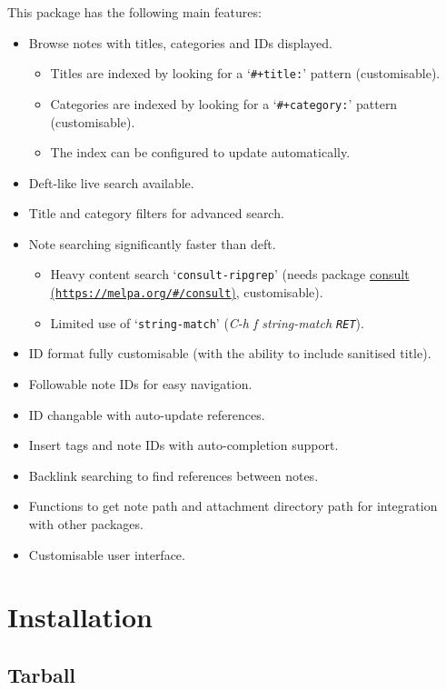 \documentclass{book}
\newcommand\Texinfocommandstyletextkbd[1]{{\ttfamily\textsl{#1}}}%
\renewcommand{\_}{\Texinfounderscore\discretionary{}{}{}}
\begin{document}
This package has the following main features:
\begin{itemize}
\item Browse notes with titles, categories and IDs displayed.
\begin{itemize}
\item Titles are indexed by looking for a `\texttt{\#+title:}' pattern (customisable).
\item Categories are indexed by looking for a `\texttt{\#+category:}' pattern
(customisable).
\item The index can be configured to update automatically.
\end{itemize}
\item Deft-like live search available.
\item Title and category filters for advanced search.
\item Note searching significantly faster than deft.
\begin{itemize}
\item Heavy content search `\texttt{consult-ripgrep}' (needs package \href{https://melpa.org/\#/consult}{consult (\nolinkurl{https://melpa.org/\#/consult})},
customisable).
\item Limited use of `\texttt{string-match}' (\Texinfocommandstyletextkbd{C-h f string-match \texttt{RET}}).
\end{itemize}
\item ID format fully customisable (with the ability to include sanitised title).
\item Followable note IDs for easy navigation.
\item ID changable with auto-update references.
\item Insert tags and note IDs with auto-completion support.
\item Backlink searching to find references between notes.
\item Functions to get note path and attachment directory path for integration with
other packages.
\item Customisable user interface.
\end{itemize}

\chapter{{Installation}}
\label{anchor:Installation}%


\section{{Tarball}}
\label{anchor:Tarball}%
\end{document}

